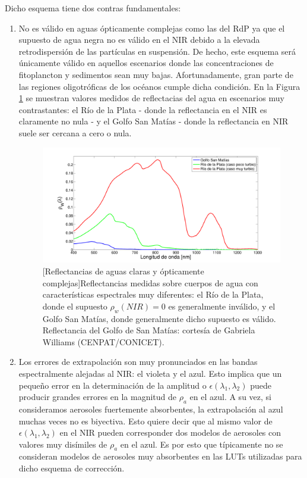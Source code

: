             Dicho esquema tiene dos contras fundamentales:
            
            \begin{enumerate}
                \item No es válido en aguas ópticamente complejas como las del RdP ya que el supuesto de agua negra no es válido en el NIR debido a la elevada retrodispersión de las partículas en suspensión. De hecho, este esquema será únicamente válido en aquellos escenarios donde las concentraciones de fitoplancton y sedimentos sean muy bajas. Afortunadamente, gran parte de las regiones oligotróficas de los océanos cumple dicha condición. En la Figura \ref{int:casoIyII} se muestran valores medidos de reflectacias del agua en escenarios muy contrastantes: el Río de la Plata - donde la reflectancia en el NIR es claramente no nula - y el Golfo San Matías - donde la reflectancia en NIR suele ser cercana a cero o nula.

                \begin{figure}
                \centering
                \includegraphics[width=1\textwidth]{int/figures/casoIyII}
                [Reflectancias de aguas claras y ópticamente complejas]{Reflectancias medidas sobre cuerpos de agua con características espectrales muy diferentes: el Río de la Plata, donde el supuesto $\rho_{w}(NIR)=0$ es generalmente inválido, y el Golfo San Matías, donde generalmente dicho supuesto es válido. Reflectancia del Golfo de San Matías: cortesía de Gabriela Williams (CENPAT/CONICET).}
                \label{int:casoIyII}
                \end{figure}

                \item Los errores de extrapolación son muy pronunciados en las bandas espectralmente alejadas al NIR: el violeta y el azul. Esto implica que un pequeño error en la determinación de la amplitud o $\epsilon(\lambda_{1},\lambda_{2})$ puede producir grandes errores en la magnitud de $\rho_{a}$ en el azul. A su vez, si consideramos aerosoles fuertemente absorbentes, la extrapolación al azul muchas veces no es biyectiva. Esto quiere decir que al mismo valor de $\epsilon(\lambda_{1},\lambda_{2})$ en el NIR pueden corresponder dos modelos de aerosoles con valores muy disímiles de $\rho_{a}$ en el azul. Es por esto que típicamente no se consideran modelos de aerosoles muy absorbentes en las LUTs utilizadas para dicho esquema de corrección. 
            \end{enumerate}


